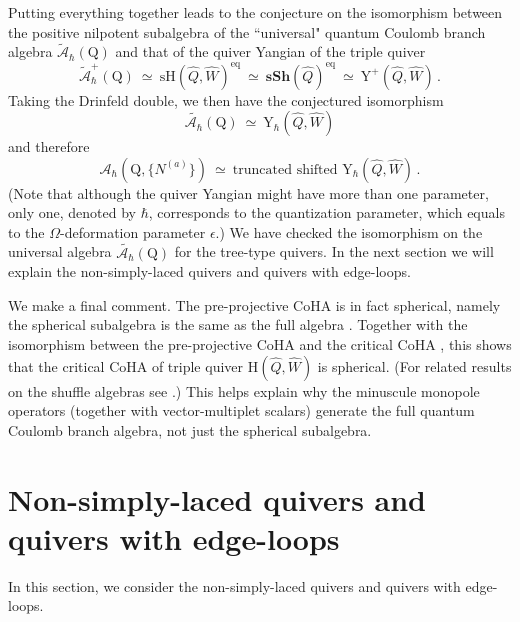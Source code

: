 \documentclass[12pt,a4paper]{article}
\renewcommand{\(}{\left(}
\renewcommand{\)}{\right)}
\renewcommand{\(}{\left(}
\renewcommand{\)}{\right)}
\begin{document}
Putting everything together leads to the conjecture on the isomorphism between the positive nilpotent subalgebra of the ``universal" quantum Coulomb branch algebra $\tilde{\mathcal{A}}_{\hbar}(\mathrm{Q})$ and that of the quiver Yangian of the triple quiver
\begin{equation}
\tilde{\mathcal{A}}^{+}_{\hbar}(\mathrm{Q})
\ \simeq \
\textrm{sH}(\widehat{Q},\widehat{W})^{\textrm{eq}}
\ \simeq \
\mathbf{sSh}(\widehat{Q})^{\textrm{eq}} 
\ \simeq \
\mathrm{Y}^{+}(\widehat{Q},\widehat{W})\,.
\end{equation}
Taking the Drinfeld double, we then have the conjectured isomorphism 
\begin{equation}
\tilde{\mathcal{A}_{\hbar}}(\mathrm{Q})
\ \simeq \
\mathrm{Y}_{\hbar} (\widehat{Q},\widehat{W})
\end{equation}
and therefore
\begin{equation}
\mathcal{A}_{\hbar}(\mathrm{Q},\{N^{(a)}\})
\ \simeq \
\textrm{truncated shifted }
\mathrm{Y}_{\hbar}(\widehat{Q},\widehat{W}) \,.
\end{equation}
(Note that although the quiver Yangian might have more than one parameter, only one, denoted by $\hbar$, corresponds to the quantization parameter, which equals to the $\Omega$-deformation parameter $\epsilon$.)
We have checked the isomorphism on the universal algebra $\tilde{\mathcal{A}_{\hbar}}(\mathrm{Q})$ for the tree-type quivers.
In the next section we will explain the non-simply-laced quivers and quivers with edge-loops.

\medskip

We make a final comment.
The pre-projective CoHA is in fact spherical, namely the spherical subalgebra is the same as the full algebra \cite{negut2023}. 
Together with  the isomorphism between the pre-projective CoHA and the critical CoHA \cite{Yang_2016}, this shows that the critical CoHA of triple quiver H$(\widehat{Q},\widehat{W}
)$ is spherical.
(For related results on the shuffle algebras see \cite{negut2022}.) 
This helps explain why the minuscule monopole operators (together with vector-multiplet scalars) generate the full quantum Coulomb branch algebra, not just the spherical subalgebra. 

\section{Non-simply-laced quivers and quivers with edge-loops}
\label{sec:BeyondSimple}
In this section, we consider the non-simply-laced quivers and quivers with edge-loops.
\end{document}
